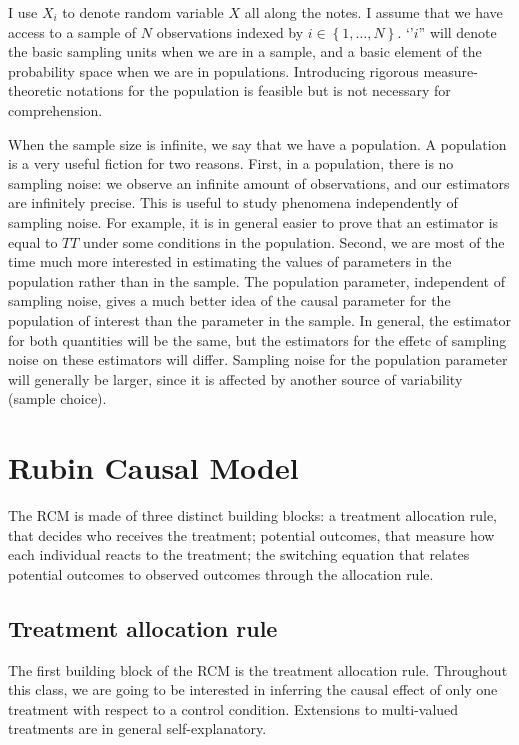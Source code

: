 \documentclass[]{book}
\theoremstyle{definition}
\theoremstyle{definition}
\theoremstyle{definition}
\theoremstyle{remark}
\begin{document}
I use \(X_i\) to denote random variable \(X\) all along the notes. I
assume that we have access to a sample of \(N\) observations indexed by
\(i\in\left\{1,\dots,N\right\}\). `'\(i\)'' will denote the basic
sampling units when we are in a sample, and a basic element of the
probability space when we are in populations. Introducing rigorous
measure-theoretic notations for the population is feasible but is not
necessary for comprehension.

When the sample size is infinite, we say that we have a population. A
population is a very useful fiction for two reasons. First, in a
population, there is no sampling noise: we observe an infinite amount of
observations, and our estimators are infinitely precise. This is useful
to study phenomena independently of sampling noise. For example, it is
in general easier to prove that an estimator is equal to \(TT\) under
some conditions in the population. Second, we are most of the time much
more interested in estimating the values of parameters in the population
rather than in the sample. The population parameter, independent of
sampling noise, gives a much better idea of the causal parameter for the
population of interest than the parameter in the sample. In general, the
estimator for both quantities will be the same, but the estimators for
the effetc of sampling noise on these estimators will differ. Sampling
noise for the population parameter will generally be larger, since it is
affected by another source of variability (sample choice).

\section{Rubin Causal Model}\label{rubin-causal-model}

The RCM is made of three distinct building blocks: a treatment
allocation rule, that decides who receives the treatment; potential
outcomes, that measure how each individual reacts to the treatment; the
switching equation that relates potential outcomes to observed outcomes
through the allocation rule.

\subsection{Treatment allocation rule}\label{treatment-allocation-rule}

The first building block of the RCM is the treatment allocation rule.
Throughout this class, we are going to be interested in inferring the
causal effect of only one treatment with respect to a control condition.
Extensions to multi-valued treatments are in general self-explanatory.
\end{document}
